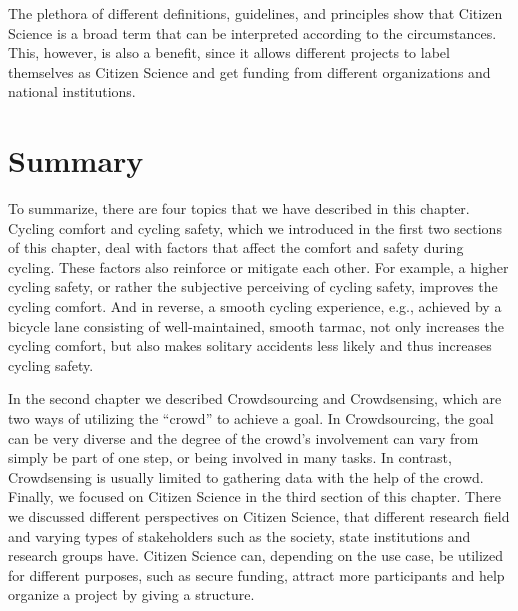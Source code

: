 The plethora of different definitions, guidelines, and principles show that Citizen Science is a broad term that can be interpreted according to the circumstances.
This, however, is also a benefit, since it allows different projects to label themselves as Citizen Science and get funding from different organizations and national institutions.

\section{Summary}
\label{sec:summary_background}
To summarize, there are four topics that we have described in this chapter.
Cycling comfort and cycling safety, which we introduced in the first two sections of this chapter, deal with factors that affect the comfort and safety during cycling.
These factors also reinforce or mitigate each other.
For example, a higher cycling safety, or rather the subjective perceiving of cycling safety, improves the cycling comfort.
And in reverse, a smooth cycling experience, e.g., achieved by a bicycle lane consisting of well-maintained, smooth tarmac, not only increases the cycling comfort, but also makes solitary accidents less likely and thus increases cycling safety.

In the second chapter we described Crowdsourcing and Crowdsensing, which are two ways of utilizing the ``crowd'' to achieve a goal.
In Crowdsourcing, the goal can be very diverse and the degree of the crowd's involvement can vary from simply be part of one step, or being involved in many tasks.
In contrast, Crowdsensing is usually limited to gathering data with the help of the crowd.
Finally, we focused on Citizen Science in the third section of this chapter.
There we discussed different perspectives on Citizen Science, that different research field and varying types of stakeholders such as the society, state institutions and research groups have.
Citizen Science can, depending on the use case, be utilized for different purposes, such as secure funding, attract more participants and help organize a project by giving a structure.

